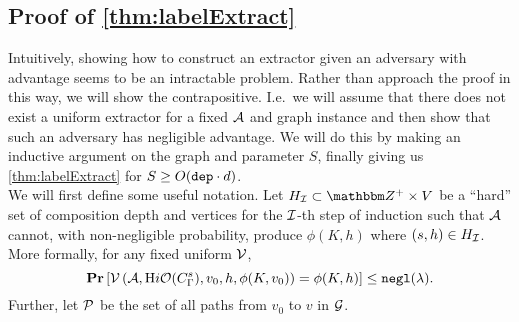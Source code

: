 \subsection{Proof of \cref{thm:labelExtract}}
Intuitively, showing how to construct an extractor given an adversary with advantage seems to be an
intractable problem. Rather than approach the proof in this way, we will show the contrapositive.
I.e.\ we will assume that there does not exist a uniform extractor for a fixed $\mathcal{A}$ and graph instance and then show that
such an adversary has negligible advantage. We will do this by making an inductive argument on the graph and parameter $S$, finally giving us \cref{thm:labelExtract} for $S \geq O(\texttt{dep} \cdot d)$.\\


We will first define some useful notation. Let $H_\inductiveInd \subset \Z^+ \times V$ be a ``hard'' set of 
composition depth and vertices for the $\mathcal{I}$-th step of induction such that $\mathcal{A}$ cannot, with non-negligible probability, produce
$\phi(K, h)$ where $(s, h) \in H_{\mathcal{I}}$. More formally, for any fixed uniform $\mathcal{V}$,
\begin{equation*}
	\operatorname*{\mathbf{Pr}}\left[\mathcal{V}\left(\mathcal{A}, \text{H}i\mathcal{O}(C_\Gamma^s), v_0, h, \phi(K, v_0)\right) = \phi(K, h)\right] \leq \texttt{negl}(\lambda).
\end{equation*}
Further, let $\mathcal{P}$ be the set of all paths from $v_0$ to $v$ in $\mathcal{G}$.

